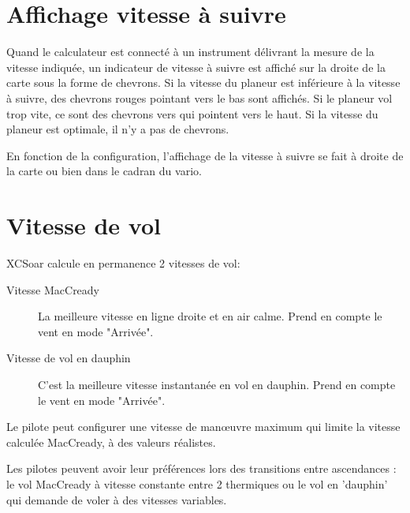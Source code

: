\section{Affichage vitesse à suivre}

Quand le calculateur est connecté à un instrument délivrant la mesure de la vitesse indiquée, un indicateur de vitesse à suivre est affiché sur la droite de la carte sous la forme de chevrons. Si la vitesse du planeur est inférieure à la vitesse à suivre, des chevrons rouges pointant vers le bas sont affichés. Si le planeur vol trop vite, ce sont des chevrons vers qui pointent vers le haut. Si la vitesse du planeur est optimale, il n'y a pas de chevrons.

En fonction de la configuration, l'affichage de la vitesse à suivre se fait à droite de la carte ou bien dans le cadran du vario.

\section{Vitesse de vol}\label{sec:stf}

XCSoar calcule en permanence 2 vitesses de vol:
\begin{description}
\item[Vitesse MacCready]  La meilleure vitesse en ligne droite et en air calme. Prend en compte le vent en mode "Arrivée".
\item[Vitesse de vol en dauphin]  C'est la meilleure vitesse instantanée en vol en dauphin. Prend en compte le vent en mode "Arrivée".
\end{description}

Le pilote peut configurer une vitesse de manœuvre maximum qui limite la vitesse calculée MacCready, à des valeurs réalistes.

Les pilotes peuvent avoir leur préférences lors des transitions entre ascendances : le vol MacCready à vitesse constante entre 2 thermiques ou le vol en 'dauphin' qui demande de voler à des vitesses variables.

